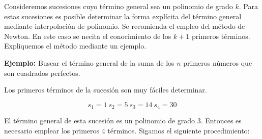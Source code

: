 Consideremos sucesiones cuyo término general sea un polinomio de grado $k$. Para estas sucesiones es posible determinar la forma explícita del término general mediante interpolación de polinomio. Se recomienda el empleo del método de Newton. En este caso se necita el conocimiento de los $k + 1$ primeros términos. Expliquemos el método mediante un ejemplo.

\textbf{Ejemplo:} Buscar el término general de la suma de los $n$ primeros números que son cuadrados perfectos.

Los primeros términos de la sucesión son muy fáciles determinar.

$$s_1=1 ~ s_2=5 ~ s_3=14 ~ s_4=30 $$

El término general de esta sucesión es un polinomio de grado 3. Entonces es necesario emplear los primeros 4 términos. Sigamos el siguiente procedimiento:

